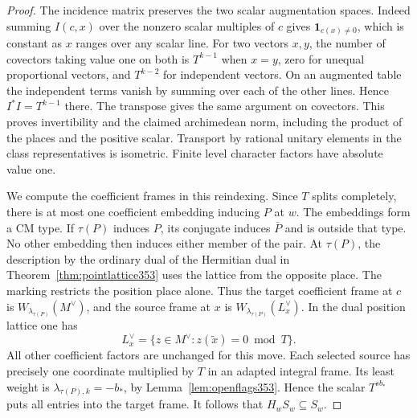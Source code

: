 \documentclass[a4paper,11pt]{article}
\theoremstyle{definition}
\theoremstyle{remark}
\numberwithin{equation}{section}
\begin{document}
\begin{proof}
The incidence matrix preserves the two scalar augmentation
spaces. Indeed summing \(I(c,x)\) over the nonzero scalar
multiples of \(c\) gives \(\mathbf1_{c(x)\ne0}\), which is
constant as \(x\) ranges over any scalar line. For two vectors
\(x,y\), the number of covectors taking value one on both is
\(T^{k-1}\) when \(x=y\), zero for unequal proportional
vectors, and \(T^{k-2}\) for independent vectors. On an
augmented table the independent terms vanish by summing over
each of the other lines. Hence \(I^*I=T^{k-1}\) there. The
transpose gives the same argument on covectors. This proves
invertibility and the claimed archimedean norm, including the
product of the places and the positive scalar. Transport by
rational unitary elements in the class representatives is
isometric. Finite level character factors have absolute
value one.

We compute the coefficient frames in this reindexing. Since
\(T\) splits completely, there is at most one coefficient
embedding inducing \(P\) at \(w\). The embeddings form a CM
type. If \(\tau(P)\) induces \(P\), its conjugate induces
\(\bar P\) and is outside that type. No other embedding then
induces either member of the pair. At \(\tau(P)\), the
description by the ordinary dual of the Hermitian dual in
Theorem~\ref{thm:pointlattice353} uses the lattice from the
opposite place. The marking restricts the position place
alone. Thus the target coefficient frame at \(c\) is
\(W_{\lambda_{\tau(P)}}(M^\vee)\), and the source frame
at \(x\) is \(W_{\lambda_{\tau(P)}}(L_x^\vee)\). In the
dual position lattice one has
\[
       L_x^\vee=\{z\in M^\vee:z(\tilde x)=0\bmod T\}.
\]
All other coefficient factors are unchanged for this move.
Each selected source has precisely one coordinate multiplied
by \(T\) in an adapted integral frame. Its least weight is
\(\lambda_{\tau(P),k}=-b_*\), by
Lemma~\ref{lem:openflags353}. Hence the scalar \(T^{s b_*}\)
puts all entries into the target frame. It follows that
\(H_w S_w\subseteq S_w\).


\end{proof}
\end{document}
